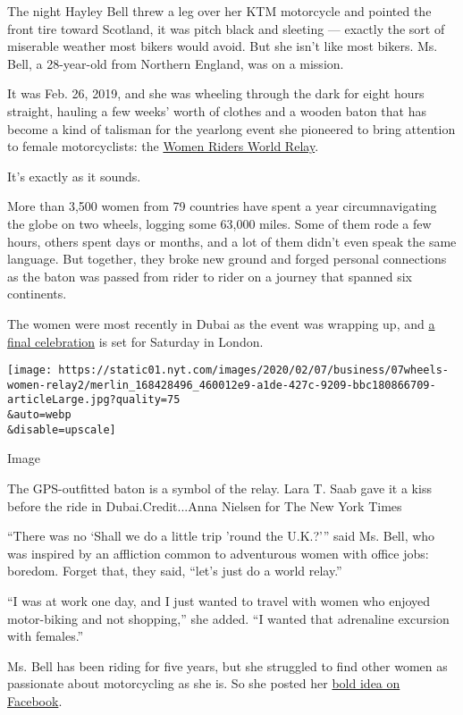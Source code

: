 The night Hayley Bell threw a leg over her KTM motorcycle and pointed
the front tire toward Scotland, it was pitch black and sleeting ---
exactly the sort of miserable weather most bikers would avoid. But she
isn't like most bikers. Ms. Bell, a 28-year-old from Northern England,
was on a mission.

It was Feb. 26, 2019, and she was wheeling through the dark for eight
hours straight, hauling a few weeks' worth of clothes and a wooden baton
that has become a kind of talisman for the yearlong event she pioneered
to bring attention to female motorcyclists: the
\href{https://womenridersworldrelay.com/}{Women Riders World Relay}.

It's exactly as it sounds.

More than 3,500 women from 79 countries have spent a year
circumnavigating the globe on two wheels, logging some 63,000 miles.
Some of them rode a few hours, others spent days or months, and a lot of
them didn't even speak the same language. But together, they broke new
ground and forged personal connections as the baton was passed from
rider to rider on a journey that spanned six continents.

The women were most recently in Dubai as the event was wrapping up, and
\href{https://www.instagram.com/p/B7p99oIBxLi/}{a final celebration} is
set for Saturday in London.

\texttt{[image: https://static01.nyt.com/images/2020/02/07/business/07wheels-women-relay2/merlin\_168428496\_460012e9-a1de-427c-9209-bbc180866709-articleLarge.jpg?quality=75\\\&auto=webp\\\&disable=upscale]}

Image

The GPS-outfitted baton is a symbol of the relay. Lara T. Saab gave it a
kiss before the ride in Dubai.Credit...Anna Nielsen for The New York
Times

``There was no `Shall we do a little trip 'round the U.K.?''' said Ms.
Bell, who was inspired by an affliction common to adventurous women with
office jobs: boredom. Forget that, they said, ``let's just do a world
relay.''

``I was at work one day, and I just wanted to travel with women who
enjoyed motor-biking and not shopping,'' she added. ``I wanted that
adrenaline excursion with females.''

Ms. Bell has been riding for five years, but she struggled to find other
women as passionate about motorcycling as she is. So she posted her
\href{https://www.facebook.com/groups/2149024862007828/}{bold idea on
Facebook}.

